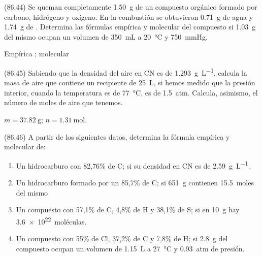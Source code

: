   \begin{exercise}[
      tags    = {},
      topics  = {química,química básica},
      source  = {FQ 1B MGH 2016, p86, e44},
    ]
    (86.44) Se queman completamente \SI{1.50}{\gram} de un compuesto orgánico
    formado por carbono, hidrógeno y oxígeno. En la combustión
    se obtuvieron \SI{0.71}{\gram} de agua y \SI{1.74}{\gram} de . Determina las fórmulas empírica y molecular del compuesto si
    \SI{1.03}{\gram} del mismo ocupan un volumen de \SI{350}{\milli\liter} a \SI{20}{\celsius} y \SI{750}{\mmHg}.
  \end{exercise}

  \begin{solution}
    Empírica ; molecular 
  \end{solution}




  \begin{exercise}[
      tags    = {},
      topics  = {química,química básica},
      source  = {FQ 1B MGH 2016, p86, e45},
    ]
    (86.45) Sabiendo que la densidad del aire en CN es de \SI{1.293}{\gram\per\liter}, calcula la masa de aire que contiene un recipiente de \SI{25}{\liter}, si hemos medido que la presión interior, cuando la temperatura es de \SI{77}{\celsius}, es de \SI{1.5}{atm}. Calcula, asimismo, el número de moles de aire que tenemos.
  \end{exercise}

  \begin{solution}
    \( m = \SI{37.82}{\gram} \); \( n = \SI{1.31}{\mole} \).
  \end{solution}




  \begin{exercise}[
      tags    = {},
      topics  = {química,química básica},
      source  = {FQ 1B MGH 2016, p86, e46},
    ]
    (86.46) A partir de los siguientes datos, determina la fórmula empírica y molecular de:

    \begin{enumerate}
      \item Un hidrocarburo con 82,76\% de C; si su densidad en CN es de \SI{2.59}{\gram\per\liter}.
      \item Un hidrocarburo formado por un 85,7\% de C; si \SI{651}{\gram} contienen \SI{15.5}{moles} del mismo
      \item Un compuesto con 57,1\% de C, 4,8\% de H y 38,1\% de S; si en \SI{10}{\gram} hay \SI{3.6e22}{moléculas}.
      \item Un compuesto con 55\% de Cl, 37,2\% de C y 7,8\% de H; si \SI{2.8}{\gram} del compuesto ocupan un volumen de \SI{1.15}{\liter} a \SI{27}{\celsius} y \SI{0.93}{atm} de presión.
    \end{enumerate}
  \end{exercise}

